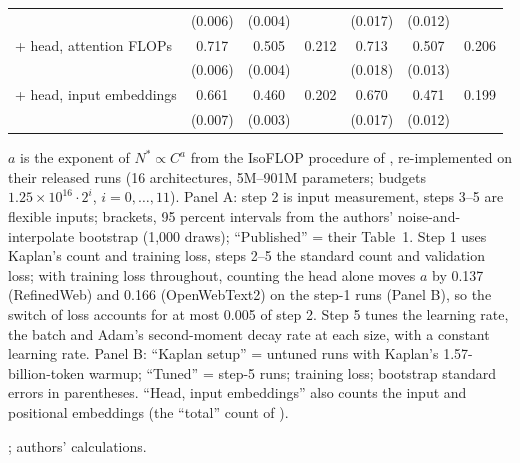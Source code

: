 \begin{table}[tp]
\begin{tabular*}{\textwidth}{@{\extracolsep{\fill}}lcccccc@{}}
 & (0.006) & (0.004) & & (0.017) & (0.012) & \\
+ head, attention FLOPs & 0.717 & 0.505 & 0.212 & 0.713 & 0.507 & 0.206 \\
 & (0.006) & (0.004) & & (0.018) & (0.013) & \\
+ head, input embeddings & 0.661 & 0.460 & 0.202 & 0.670 & 0.471 & 0.199 \\
 & (0.007) & (0.003) & & (0.017) & (0.012) & \\
\bottomrule
\end{tabular*}
\par\smallskip
\begin{tablenotes}
$a$ is the exponent of $N^*\propto C^{a}$ from the IsoFLOP procedure of \citet{porian2024resolving}, re-implemented
on their released runs (16 architectures, 5M--901M parameters; budgets $1.25\times10^{16}\cdot2^i$, $i=0,\dots,11$).
Panel A: step 2 is input measurement, steps 3--5 are flexible inputs; brackets, 95 percent intervals from the authors'
noise-and-interpolate bootstrap (1,000 draws); ``Published'' = their Table~1. Step 1 uses Kaplan's count and training
loss, steps 2--5 the standard count and validation loss; with training loss throughout, counting the head alone moves
$a$ by 0.137 (RefinedWeb) and 0.166 (OpenWebText2) on the step-1 runs (Panel B), so the switch of loss accounts for at
most 0.005 of step 2. Step 5 tunes the learning rate, the batch and Adam's second-moment decay rate at each size, with a
constant learning rate. Panel B: ``Kaplan setup'' = untuned runs with Kaplan's 1.57-billion-token warmup; ``Tuned'' =
step-5 runs; training loss; bootstrap standard errors in parentheses. ``Head, input embeddings'' also counts the input
and positional embeddings (the ``total'' count of \citet{pearce2024reconciling}).
\end{tablenotes}
\begin{tablenotes}[Source]
\citet{porian2024resolving}; authors' calculations.
\end{tablenotes}
\end{table}
